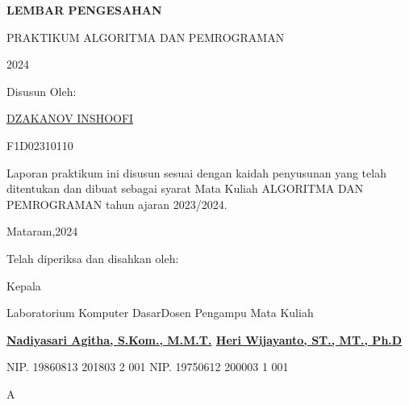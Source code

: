 \documentclass[../main.tex]{subfiles}
\begin{document}
    \begin{center}
        \hdsize\bfseries
        LEMBAR PENGESAHAN

        PRAKTIKUM ALGORITMA DAN PEMROGRAMAN

        2024
    \end{center}
    \vspace{10em}
    \begin{center}
        \normalsize\bfseries

        Disusun Oleh:

        \underline{DZAKANOV INSHOOFI}

        F1D02310110
    \end{center}
    \vspace{1ex}
    \noindent Laporan praktikum ini disusun sesuai dengan kaidah penyusunan yang telah ditentukan dan dibuat sebagai syarat Mata Kuliah ALGORITMA DAN PEMROGRAMAN tahun ajaran 2023/2024.
    \vspace{4em}
    \begin{flushright}
        Mataram,\hspace{19ex}2024
    \end{flushright}
    \vspace{1ex}
    \begin{center}
        Telah diperiksa dan disahkan oleh:
    \end{center}
    \vspace{1ex}
    \begin{center}
        \hspace{16ex}Kepala\hspace{\fill}

        \hspace{4ex}Laboratorium Komputer Dasar\hspace{20ex}Dosen Pengampu Mata Kuliah
    \end{center}
    \vspace{6em}
    \begin{flushleft}
        \bfseries
        \hspace{3ex}\underline{Nadiyasari Agitha, S.Kom., M.M.T.}\hspace{14ex}
        \underline{Heri Wijayanto, ST., MT., Ph.D}
        \normalfont

        \hspace{6ex}NIP. 19860813 201803 2 001\hspace{22ex}
        NIP. 19750612 200003 1 001
    \end{flushleft}

    \newpage
    \pagecolor{bgcol}
    {\color{bgcol}A}
    \newpage
    \pagecolor{white}
\end{document}
